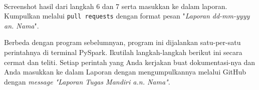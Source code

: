 \documentclass[a4paper]{tufte-handout}
\begin{document}
\vspace*{-.5cm}
 \\
Screenshot hasil dari langkah 6 dan 7 serta masukkan ke dalam laporan. Kumpulkan melalui {\tt pull requests} dengan format pesan "\textit{Laporan dd-mm-yyyy an. Nama}".

\hrulefill

\clearpage


Berbeda dengan program sebelumnyan, program ini dijalankan satu-per-satu perintahnya di terminal PySpark. Ikutilah langkah-langkah berikut ini secara cermat dan teliti. Setiap perintah yang Anda kerjakan buat dokumentasi-nya dan Anda masukkan ke dalam Laporan dengan mengumpulkannya melalui GitHub dengan \textit{message "Laporan Tugas Mandiri a.n. Nama"}.
\end{document}
